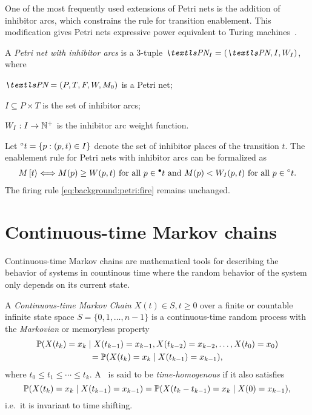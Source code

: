 One of the most frequently used extensions of Petri nets is the
addition of inhibitor arcs, which constrains the rule for transition
enablement. This modification gives Petri nets expressive power
equivalent to Turing
machines~\citep{DBLP:conf/apn/Chrzastowski-Wachtel99}.

\begin{dfn}
  A \emph{Petri net with inhibitor arcs} is a 3-tuple $\PNI = (\PN,
  I, W_I)$, where
  \begin{asparaitem}
  \item $\PN = (P, T, F, W, M_0)$ is a Petri net;
  \item $I \subseteq P \times T$ is the set of inhibitor arcs;
  \item $W_I: I \to \NNpos$ is the inhibitor arc weight function.
  \end{asparaitem}
\end{dfn}

Let $\inharc{t} = \{ p : (p, t) \in I\}$ denote the set of inhibitor
places of the transition $t$. The enablement rule for Petri nets with
inhibitor arcs can be formalized as
\begin{equation}
  \label{eq:background:petri:inh-fire}
  M\,\tranto{t} \Longleftrightarrow \text{\strut$M(p) \ge W(p, t)$ for all
    $p \in \inarc{t}$ and $M(p) < W_I(p, t)$ for all $p \in
    \inharc{t}$.}
\end{equation}
The firing rule \eqref{eq:background:petri:fire} remains unchanged.

\section{Continuous-time Markov chains}

Continuous-time Markov chains are mathematical tools for describing the
behavior of systems in countinous time where the random behavior of
the system only depends on its current state.

\begin{dfn}
  A \emph{Continuous-time Markov Chain} \paren{\CTMC}
  $X(t) \in S, t \ge 0$ over a finite or countable infinite state
  space $S = \{0, 1, \ldots, n - 1\}$ is a continuous-time random
  process with the \emph{Markovian} or memoryless property
  \begin{multline}\allowdisplaybreaks[0]
    \Pr(X(t_k) = x_k \mid X(t_{k - 1}) = x_{k - 1}, X(t_{k -
      2}) = x_{k - 2}, \ldots, X(t_{0}) = x_{0}) \\
    = \Pr(X(t_k) = x_k \mid X(t_{k - 1}) = x_{k - 1}) \text,
  \end{multline}
  where $t_0 \le t_1 \le \cdots \le t_k$. A \CTMC\ is said to be
  \emph{time-homogenous} if it also satisfies
  \begin{equation}
    \Pr(X(t_k) = x_k \mid X(t_{k - 1}) = x_{k - 1}) = \Pr(X(t_k - t_{k -
      1}) = x_k \mid X(0) = x_{k - 1}) \text,
  \end{equation}
  i.e.~it is invariant to time shifting.
\end{dfn}

